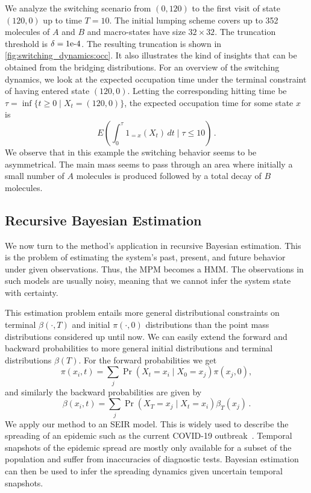 We analyze the switching scenario from $(0, 120)$ to the first visit of state $(120, 0)$ up to time $T=10$. The initial lumping scheme covers up to 352 molecules of $A$ and $B$ and  macro-states have size $32\times32$.
The truncation threshold is $\delta= \text{1e-4} $.
The resulting truncation is shown in \autoref{fig:switching_dynamics:occ}.
It also illustrates the kind of insights that can be obtained from the bridging distributions.
For an overview of the switching dynamics, we look at the expected occupation time under the terminal constraint of having entered state $(120,0)$. Letting the corresponding hitting time be $\tau=\inf\{t\geq 0\mid X_t=(120, 0)\}$, the expected occupation time for some state $x$ is
\[
	E\left(\int_0^{\tau}1_{=x}(X_t)\,dt\mid \tau\leq 10\right)\,.
\]
We observe that in this example the switching  behavior seems to be asymmetrical.
The main mass seems to pass through an area where initially a small number of $A$ molecules is produced followed by a total decay of $B$ molecules.


\subsection{Recursive Bayesian Estimation}
We now turn to the method's application in recursive Bayesian estimation.
This is the problem of estimating the system's
past, present, and future behavior under given observations.
Thus, the \ac{MPM} becomes a \acf{HMM}.
The observations in such models are usually noisy, meaning that we cannot infer the system state with certainty.

This estimation problem entails more general distributional constraints on terminal $\beta(\cdot,T)$ and initial $\pi(\cdot, 0)$ distributions than the point mass distributions considered up until now.
We can easily extend the forward and backward probabilities to more general initial
distributions   and terminal distributions $\beta(T)$.
For the forward probabilities we get
\begin{equation}
    \pi(x_i, t) = \sum_j \Pr(X_t=x_i\mid X_0=x_j) \pi(x_j,0),
\end{equation}
and similarly the backward probabilities are given by
\begin{equation}
    \beta(x_i, t) = \sum_j\Pr(X_T=x_j\mid X_t = x_i) \beta_T(x_j)\,.
\end{equation}
We apply our method to an \acf{SEIR} model.
This is widely used to describe the spreading of an epidemic such as the current COVID-19 outbreak~\cite{he2020seir,grossmann2020importance}.
Temporal snapshots of the epidemic spread  are mostly only available for a subset of the population and suffer from   inaccuracies of diagnostic tests.
Bayesian estimation can then be used to infer the spreading dynamics given uncertain temporal snapshots.

